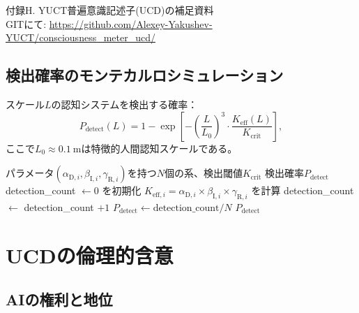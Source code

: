 \documentclass[11pt,a4paper]{article}
\newcommand{\eff}{\mathrm{eff}}
\newcommand{\Ke}{K_{\eff}}
\newcommand{\Kcrit}{K_{\mathrm{crit}}}
\begin{document}
	付録H. YUCT普遍意識記述子(UCD)の補足資料 \\ GITにて: \url{https://github.com/Alexey-Yakushev-YUCT/consciousness_meter_ucd/}
	
	\subsection{検出確率のモンテカルロシミュレーション}
	
	スケール\(L\)の認知システムを検出する確率：
	\[
	P_{\mathrm{detect}}(L) = 1 - \exp\!\left[-\left(\frac{L}{L_0}\right)^3 \cdot \frac{\Ke(L)}{\Kcrit}\right],
	\]
	ここで\(L_0 \approx 0.1~\mathrm{m}\)は特徴的人間認知スケールである。
	
	\begin{algorithm}
		\caption{認知システム検出のモンテカルロシミュレーション}
		\begin{algorithmic}[1]
			\Require パラメータ\((\alpha_{\mathrm{D},i}, \beta_{\mathrm{I},i}, \gamma_{\mathrm{R},i})\)を持つ\(N\)個の系、検出閾値\(\Kcrit\)
			\Ensure 検出確率\(P_{\mathrm{detect}}\)
			\State detection\_count \(\gets 0\) を初期化
			\State \(K_{\eff,i} = \alpha_{\mathrm{D},i} \times \beta_{\mathrm{I},i} \times \gamma_{\mathrm{R},i}\) を計算
			\If{\(K_{\eff,i} > \Kcrit\)}
			\State detection\_count \(\gets\) detection\_count \(+ 1\)
			\EndIf
			\EndFor
			\State \(P_{\mathrm{detect}} \gets \text{detection\_count} / N\)
			\Return \(P_{\mathrm{detect}}\)
		\end{algorithmic}
	\end{algorithm}
	
	\section{UCDの倫理的含意}
	
	\subsection{AIの権利と地位}
	
\end{document}
